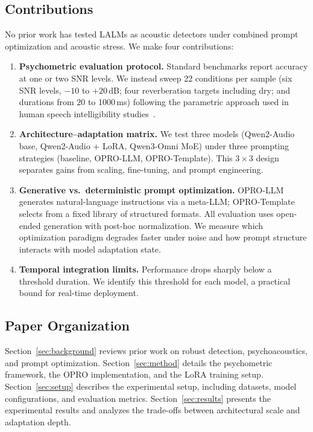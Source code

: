 \documentclass[11pt,a4paper]{article}
\begin{document}
\subsection{Contributions}
\label{subsec:contributions}

No prior work has tested LALMs as acoustic detectors under combined prompt optimization and acoustic stress. We make four contributions:

\begin{enumerate}
    \item \textbf{Psychometric evaluation protocol.} Standard benchmarks report accuracy at one or two SNR levels. We instead sweep 22 conditions per sample (six SNR levels, $-10$ to $+20$\,dB; four reverberation targets including dry; and durations from 20 to 1000\,ms) following the parametric approach used in human speech intelligibility studies~\cite{macpherson2014variations, kocinski2016time}.
    
    \item \textbf{Architecture--adaptation matrix.} We test three models (Qwen2-Audio base, Qwen2-Audio + LoRA, Qwen3-Omni MoE) under three prompting strategies (baseline, OPRO-LLM, OPRO-Template). This $3 \times 3$ design separates gains from scaling, fine-tuning, and prompt engineering.
    
    \item \textbf{Generative vs.\ deterministic prompt optimization.} OPRO-LLM generates natural-language instructions via a meta-LLM; OPRO-Template selects from a fixed library of structured formats. All evaluation uses open-ended generation with post-hoc normalization. We measure which optimization paradigm degrades faster under noise and how prompt structure interacts with model adaptation state.
    
    \item \textbf{Temporal integration limits.} Performance drops sharply below a threshold duration. We identify this threshold for each model, a practical bound for real-time deployment.
\end{enumerate}

\subsection{Paper Organization}
\label{subsec:organization}

Section~\ref{sec:background} reviews prior work on robust detection, psychoacoustics, and prompt optimization. Section~\ref{sec:method} details the psychometric framework, the OPRO implementation, and the LoRA training setup. Section~\ref{sec:setup} describes the experimental setup, including datasets, model configurations, and evaluation metrics. Section~\ref{sec:results} presents the experimental results and analyzes the trade-offs between architectural scale and adaptation depth.
\end{document}
